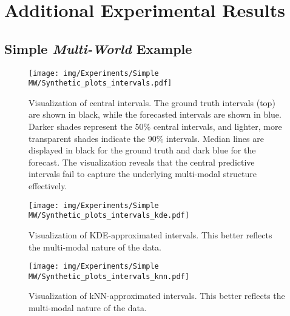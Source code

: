 \documentclass[a4paper,oneside,bibliography=totoc]{scrbook}
\begin{document}
\chapter{Additional Experimental Results}
\label{ch:additional_exp}

\section{Simple \textit{Multi-World} Example}
\begin{figure}[H]
    \centering
    \texttt{[image: img/Experiments/Simple MW/Synthetic\_plots\_intervals.pdf]}
    \caption{Visualization of central intervals. The ground truth intervals (top) are shown in black, while the forecasted intervals are shown in blue. Darker shades represent the 50\% central intervals, and lighter, more transparent shades indicate the 90\% intervals. Median lines are displayed in black for the ground truth and dark blue for the forecast. The visualization reveals that the central predictive intervals fail to capture the underlying multi-modal structure effectively.}
    \label{fig:sw_intervals}
\end{figure}

\begin{figure}
    \centering
    \texttt{[image: img/Experiments/Simple MW/Synthetic\_plots\_intervals\_kde.pdf]}
    \caption{Visualization of KDE-approximated intervals. This better reflects the multi-modal nature of the data.}
    \label{fig:sw_intervals_kde}
\end{figure}

\begin{figure}
    \centering
    \texttt{[image: img/Experiments/Simple MW/Synthetic\_plots\_intervals\_knn.pdf]}
    \caption{Visualization of kNN-approximated intervals. This better reflects the multi-modal nature of the data.}
    \label{fig:sw_intervals_knn}
\end{figure}
\end{document}
